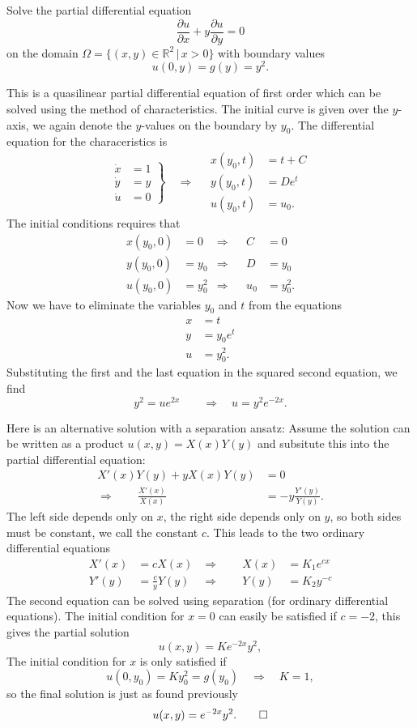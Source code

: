Solve the partial differential equation
\[
\frac{\partial u}{\partial x}+y\frac{\partial u}{\partial y}=0
\]
on the domain
$\Omega=\{(x,y)\in\mathbb R^2\,|\, x> 0\}$ with boundary values
\[
u(0,y)=g(y)=y^2.
\]

\begin{loesung}
This is a quasilinear partial differential equation of first order
which can be solved using the method of characteristics.
The initial curve is given over the $y$-axis, we again denote the
$y$-values on the boundary by $y_0$.
The differential equation for the characeristics is
\[
\left.
\begin{aligned}
\dot x&=1\\
\dot y&=y\\
\dot u&=0
\end{aligned}
\right\}\quad\Rightarrow\quad
\begin{aligned}
x(y_0,t)&=t+C\\
y(y_0,t)&=De^t\\
u(y_0,t)&=u_0.
\end{aligned}
\]
The initial conditions requires that
\begin{align*}
x(y_0,0)&=0&\Rightarrow&&C&=0\\
y(y_0,0)&=y_0&\Rightarrow&&D&=y_0\\
u(y_0,0)&=y_0^2&\Rightarrow&&u_0&=y_0^2.
\end{align*}
Now we have to eliminate the variables $y_0$ and $t$ from the equations
\begin{align*}
x&=t\\
y&=y_0e^t\\
u&=y_0^2.
\end{align*}
Substituting the first and the last equation in the squared second
equation, we find
\[
y^2=ue^{2x}\qquad\Rightarrow\quad u=y^2e^{-2x}.
\]

Here is an alternative solution with a separation ansatz:
Assume the solution can be written as a product $u(x,y)=X(x)Y(y)$
and subsitute this into the partial differential equation:
\begin{align*}
X'(x)Y(y)+yX(x)Y(y)&=0\\
\Rightarrow\qquad \frac{X'(x)}{X(x)}&=-y\frac{Y'(y)}{Y(y)}.
\end{align*}
The left side depends only on $x$, the right side depends only on $y$,
so both sides must be constant, we call the constant $c$.
This leads to the two ordinary differential equations
\begin{align*}
X'(x)&=cX(x)&\Rightarrow\qquad X(x)&=K_1e^{cx}\\
Y'(y)&=\frac{c}{y}Y(y)&\Rightarrow\qquad Y(y)&=K_2y^{-c}
\end{align*}
The second equation can be solved using separation (for ordinary
differential equations).
The initial condition for $x=0$ can easily be satisfied if
$c=-2$, this gives the partial solution
\[
u(x,y)=Ke^{-2x}y^2,
\]
The initial condition for $x$ is only satisfied  if
\[
u(0,y_0)=Ky_0^2=g(y_0)\quad\Rightarrow\quad K=1,
\]
so the final solution is just as found previously
\[
u(x,y)=e^{-2x}y^2.
\qedhere
\]
\end{loesung}
